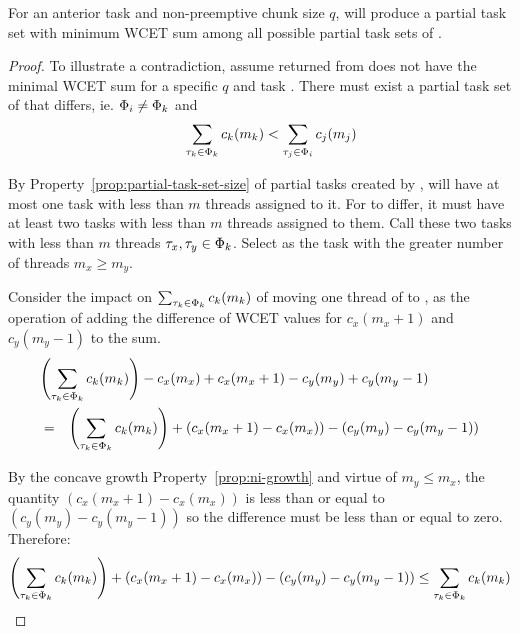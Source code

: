 \documentclass[a4paper,UKenglish,cleveref,autoref,english]{lipics-v2019}
\begin{document}
\begin{theorem}
  \label{thm:tpj-wcet-sum}
  For an anterior task  and non-preemptive chunk size ${q}$,
  \texdivide{} will produce a partial task set  with
  minimum WCET sum among all possible partial task sets of .

  \begin{proof} To illustrate a contradiction, assume 
    returned from \texdivide{} does not have the minimal WCET sum
    for a specific ${q}$ and task . There must exist  a partial
    task set  of  that differs, ie. ${\Phi_{i}
      \not = \Phi_{k}}$ and 
    \begin{equation*}
      \indent
      \sum_{\task{k} \in \Partial{k}} c_k(m_k) <
      \sum_{\task{j} \in \Partial{i}} c_j(m_j)
    \end{equation*}

    By Property~\ref{prop:partial-task-set-size} of partial tasks
    created by \texdivide{},  will have at most one task
    with less than ${m}$ threads assigned to it. For  to
    differ, it must have at least two tasks with less than ${m}$
    threads assigned to them. Call these two tasks with less than
    ${m}$ threads ${\tau_{x}, \tau_{y} \in \Phi_{k}}$. Select
     as the task with the greater number of threads
    ${m_x \ge m_y}$.

    Consider the impact on ${\sum_{\tau_{k} \in \Phi_{k}}
      c_k(m_k)}$ of moving one thread of  to , as the
    operation of adding the difference of WCET values for
    ${c_x(m_x + 1)}$ and ${c_y(m_y - 1)}$ to the sum. 
    \begin{eqnarray*}
      \lefteqn{
      \left(\sum_{\task{k} \in \Partial{k}} c_k(m_k) \right)
      - c_x(m_x) + c_x(m_x + 1)
      - c_y(m_y) + c_y(m_y - 1)} \\
      & = & \left(\sum_{\task{k} \in \Partial{k}} c_k(m_k) \right)
      + (c_x(m_x + 1) - c_x(m_x)) - (c_y(m_y) - c_y(m_y - 1))
    \end{eqnarray*}
    
    By the concave growth Property~\ref{prop:ni-growth} and virtue of
    ${m_y \le m_x}$, the quantity ${(c_x(m_x + 1) - c_x(m_x))}$ is
    less than or equal to ${(c_y(m_y) - c_y(m_y - 1))}$ so the
    difference must be less than or equal to zero. Therefore:
    \begin{equation*}
      \left(\sum_{\tau_{k} \in \Phi_{k}} c_k(m_k) \right)
      + (c_x(m_x + 1) - c_x(m_x)) - (c_y(m_y) - c_y(m_y - 1)) \le 
      \sum_{\tau_{k} \in \Phi_{k}} c_k(m_k)
    \end{equation*}


\end{proof}
\end{theorem}
\end{document}
